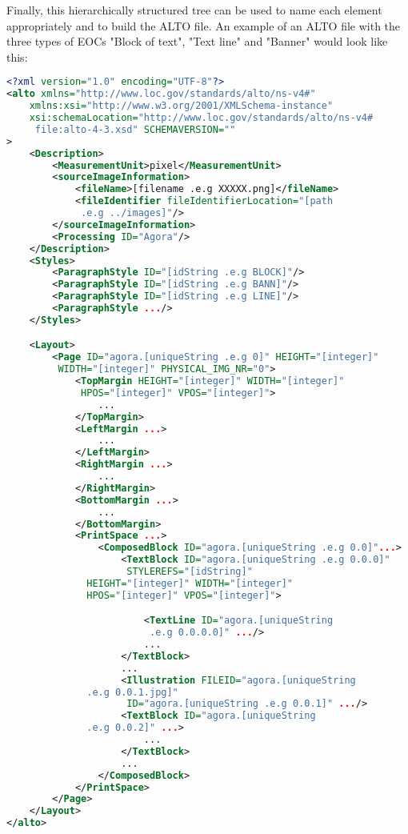 \documentclass{polytech/polytech}
\numberwithin{figure}{chapter}
\begin{document}
Finally, this hierarchically structured tree can be used to name each element appropriately and to build the ALTO file.
An example of an ALTO file with the three types of EOCs "Block of text", "Text line" and "Banner" would look like this:

\begin{lstlisting}[language=XML]
<?xml version="1.0" encoding="UTF-8"?>
<alto xmlns="http://www.loc.gov/standards/alto/ns-v4#"
    xmlns:xsi="http://www.w3.org/2001/XMLSchema-instance"
    xsi:schemaLocation="http://www.loc.gov/standards/alto/ns-v4#
     file:alto-4-3.xsd" SCHEMAVERSION=""
>
    <Description>
        <MeasurementUnit>pixel</MeasurementUnit>
        <sourceImageInformation>
            <fileName>[filename .e.g XXXXX.png]</fileName>
            <fileIdentifier fileIdentifierLocation="[path
             .e.g ../images]"/>
        </sourceImageInformation>
        <Processing ID="Agora"/>
    </Description>
    <Styles>
        <ParagraphStyle ID="[idString .e.g BLOCK]"/>
        <ParagraphStyle ID="[idString .e.g BANN]"/>
        <ParagraphStyle ID="[idString .e.g LINE]"/>
        <ParagraphStyle .../>
    </Styles>

    <Layout>
        <Page ID="agora.[uniqueString .e.g 0]" HEIGHT="[integer]"
         WIDTH="[integer]" PHYSICAL_IMG_NR="0">
            <TopMargin HEIGHT="[integer]" WIDTH="[integer]"
             HPOS="[integer]" VPOS="[integer]">
                ...
            </TopMargin>
            <LeftMargin ...>
                ...
            </LeftMargin>
            <RightMargin ...>
                ...
            </RightMargin>
            <BottomMargin ...>
                ...
            </BottomMargin>
            <PrintSpace ...>
                <ComposedBlock ID="agora.[uniqueString .e.g 0.0]"...>
                    <TextBlock ID="agora.[uniqueString .e.g 0.0.0]"
                     STYLEREFS="[idString]"
			  HEIGHT="[integer]" WIDTH="[integer]"
			  HPOS="[integer]" VPOS="[integer]">

                        <TextLine ID="agora.[uniqueString
                         .e.g 0.0.0.0]" .../>
                        ...
                    </TextBlock>
                    ...
                    <Illustration FILEID="agora.[uniqueString
			  .e.g 0.0.1.jpg]"
                     ID="agora.[uniqueString .e.g 0.0.1]" .../>
                    <TextBlock ID="agora.[uniqueString
			  .e.g 0.0.2]" ...>
                        ...
                    </TextBlock>
                    ...
                </ComposedBlock>
            </PrintSpace>
        </Page>
    </Layout>
</alto>

\end{lstlisting}
\end{document}
